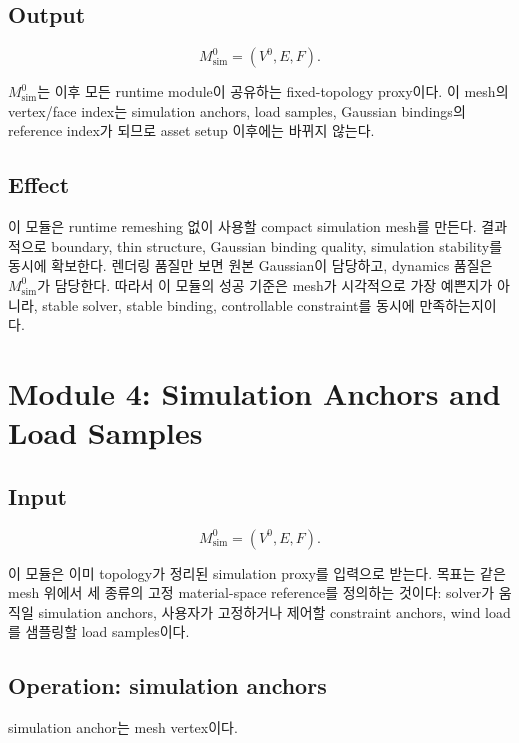 \documentclass[11pt,a4paper]{article}
\begin{document}
\subsection*{Output}

\begin{equation}
M_{\mathrm{sim}}^0=(V^0,E,F).
\end{equation}

$M_{\mathrm{sim}}^0$는 이후 모든 runtime module이 공유하는 fixed-topology proxy이다.
이 mesh의 vertex/face index는 simulation anchors, load samples, Gaussian bindings의 reference index가 되므로 asset setup 이후에는 바뀌지 않는다.

\subsection*{Effect}

이 모듈은 runtime remeshing 없이 사용할 compact simulation mesh를 만든다. 결과적으로 boundary, thin structure, Gaussian binding quality, simulation stability를 동시에 확보한다.
렌더링 품질만 보면 원본 Gaussian이 담당하고, dynamics 품질은 $M_{\mathrm{sim}}^0$가 담당한다.
따라서 이 모듈의 성공 기준은 mesh가 시각적으로 가장 예쁜지가 아니라, stable solver, stable binding, controllable constraint를 동시에 만족하는지이다.

\section{Module 4: Simulation Anchors and Load Samples}

\subsection*{Input}

\begin{equation}
M_{\mathrm{sim}}^0=(V^0,E,F).
\end{equation}

이 모듈은 이미 topology가 정리된 simulation proxy를 입력으로 받는다.
목표는 같은 mesh 위에서 세 종류의 고정 material-space reference를 정의하는 것이다: solver가 움직일 simulation anchors, 사용자가 고정하거나 제어할 constraint anchors, wind load를 샘플링할 load samples이다.

\subsection*{Operation: simulation anchors}

simulation anchor는 mesh vertex이다.
\end{document}
